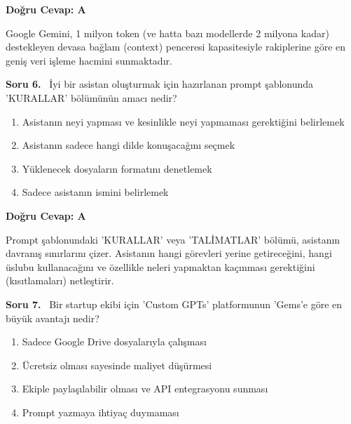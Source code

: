 \documentclass[11pt,a4paper,openany]{book}
\begin{document}
\vspace{4pt}
\begin{tcolorbox}[title=Cevap ve Açıklama, colback=gray!3!white, colframe=primarycolor!90!black, arc=2mm, fonttitle=\bfseries\sffamily, top=6pt, bottom=6pt]
    \textbf{Doğru Cevap: A}

    \vspace{2pt}
    Google Gemini, 1 milyon token (ve hatta bazı modellerde 2 milyona kadar) destekleyen devasa bağlam (context) penceresi kapasitesiyle rakiplerine göre en geniş veri işleme hacmini sunmaktadır.
\end{tcolorbox}
\vspace{10pt}
\needspace{5cm}
\vspace{8pt}
\noindent\textbf{\large\sffamily Soru 6.} \ İyi bir asistan oluşturmak için hazırlanan prompt şablonunda 'KURALLAR' bölümünün amacı nedir?

\begin{enumerate}[label=\Alph*), leftmargin=25pt, topsep=4pt, itemsep=2pt]
        \item Asistanın neyi yapması ve kesinlikle neyi yapmaması gerektiğini belirlemek
        \item Asistanın sadece hangi dilde konuşacağını seçmek
        \item Yüklenecek dosyaların formatını denetlemek
        \item Sadece asistanın ismini belirlemek
\end{enumerate}

\vspace{4pt}
\begin{tcolorbox}[title=Cevap ve Açıklama, colback=gray!3!white, colframe=primarycolor!90!black, arc=2mm, fonttitle=\bfseries\sffamily, top=6pt, bottom=6pt]
    \textbf{Doğru Cevap: A}

    \vspace{2pt}
    Prompt şablonundaki 'KURALLAR' veya 'TALİMATLAR' bölümü, asistanın davranış sınırlarını çizer. Asistanın hangi görevleri yerine getireceğini, hangi üslubu kullanacağını ve özellikle neleri yapmaktan kaçınması gerektiğini (kısıtlamaları) netleştirir.
\end{tcolorbox}
\vspace{10pt}
\needspace{5cm}
\vspace{8pt}
\noindent\textbf{\large\sffamily Soru 7.} \ Bir startup ekibi için 'Custom GPTs' platformunun 'Gems'e göre en büyük avantajı nedir?

\begin{enumerate}[label=\Alph*), leftmargin=25pt, topsep=4pt, itemsep=2pt]
        \item Sadece Google Drive dosyalarıyla çalışması
        \item Ücretsiz olması sayesinde maliyet düşürmesi
        \item Ekiple paylaşılabilir olması ve API entegrasyonu sunması
        \item Prompt yazmaya ihtiyaç duymaması
\end{enumerate}
\end{document}

